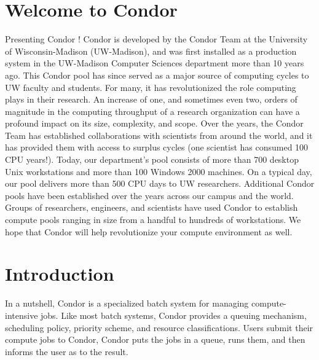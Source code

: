 \section{Welcome to Condor}  
%
% 
%

\label{sec:usermanual}
Presenting Condor \VersionNotice! Condor is developed by
the Condor Team at the University of Wisconsin-Madison (UW-Madison), and
was first installed as a production system in the UW-Madison Computer
Sciences department more than 10 years ago. This Condor pool has since
served as a major source of computing cycles to UW faculty and students.
For many, it has revolutionized the role computing plays in their
research. An increase of one, and sometimes even two, orders of
magnitude in the computing throughput of a research organization can
have a profound impact on its size, complexity, and scope. Over the
years, the Condor Team has established collaborations with scientists
from around the world, and it has provided them with access to surplus
cycles (one scientist has consumed 100 CPU years!). Today, our
department's pool consists of more than 700 desktop Unix workstations
and more than 100 Windows 2000 machines.
On a typical day, our pool delivers more than 500 CPU days to UW
researchers. Additional Condor pools have been established over the
years across our campus and the world. Groups of researchers, engineers,
and scientists have used Condor to establish compute pools ranging in
size from a handful to hundreds of workstations. We hope that Condor
will help revolutionize your compute environment as well.


\section{Introduction}


In a nutshell, Condor is a specialized batch system 
for managing compute-intensive jobs.
Like most batch systems, Condor provides a
queuing mechanism, scheduling policy, priority scheme, and resource
classifications.  Users submit their compute jobs to Condor, Condor puts
the jobs in a queue, runs them, and then informs the user as to the
result.

